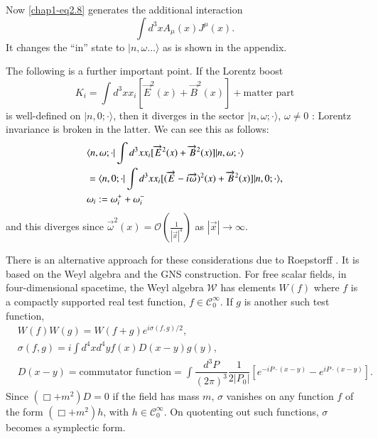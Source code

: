 Now \eqref{chap1-eq2.8} generates the additional interaction
\begin{equation}
\int d^{3}xA_{\mu}(x)J^{\mu}(x).\label{chap1-eq2.10}
\end{equation}
It changes the ``in'' state to $|n,\omega\ldots\rangle$ as is shown in the appendix.

The following is a further important point. If the Lorentz boost
\begin{equation}
K_{i}=\int d^{3}xx_{i}[\overrightarrow{E}^{2}(x)+\overrightarrow{B}^{2}(x)]+\text{matter part}\label{chap1-eq2.11}
\end{equation}
is well-defined on $|n, 0;\cdot\rangle$, then it diverges in the sector $|n,\omega;\cdot \rangle$, $\omega\neq 0$ : Lorentz invariance is broken in the latter. We can see this as follows:
\begin{align}
& \langle n,\omega;\cdot | \int d^{3}xx_{i}[\overrightarrow{E}^{2}(x)+\overrightarrow{B}^{2}(x)]|n,\omega;\cdot\rangle\notag\\
& =\langle n,0;\cdot |\int d^{3}xx_{i}[(\overrightarrow{E}-i\overrightarrow{\omega})^{2}(x)+\overrightarrow{B}^{2}(x)]|n,0;\cdot\rangle,\notag\\
&\omega_{i} := \omega^{+}_{i}+\omega^{-}_{i}\label{chap1-eq2.12}
\end{align}
and this diverges since $\overrightarrow{\omega}^{2}(x)=\mathcal{O}(\frac{1}{|\overrightarrow{x}|^{4}})$ as $|\overrightarrow{x}|\to \infty$.

There is an alternative approach for these considerations due to Roepstorff \cite{key6}. It is based on the Weyl algebra and the GNS construction. For free scalar fields, in four-dimensional spacetime, the Weyl algebra $\mathcal{W}$ has elements $W(f)$ where $f$ is a compactly supported real test function, $f\in \mathcal{C}^{\infty}_{0}$. If $g$ is another such test function,
\begin{align}
& W(f)W(g)=W(f+g)e^{i\sigma(f,g)/2},\label{chap1-eq2.13}\\
& \sigma (f,g)=i \int d^{4}xd^{4}yf(x)D(x-y)g(y),\label{chap1-eq2.14}\\
& D(x-y)=\text{commutator function} = \int \dfrac{d^{3}P}{(2\pi)^{3}}\dfrac{1}{2|P_{0}|}[e^{-iP\cdot (x-y)}-e^{iP\cdot (x-y)}].\label{chap1-eq2.15}
\end{align}
Since $(\Box + m^2)D = 0$ if the field has mass $m$, $\sigma$ vanishes on any function $f$ of the form $(\Box + m^2)h$, with $h\in \mathcal{C}^{\infty}_{0}$. On quotenting out such functions, $\sigma$ becomes a symplectic form.

